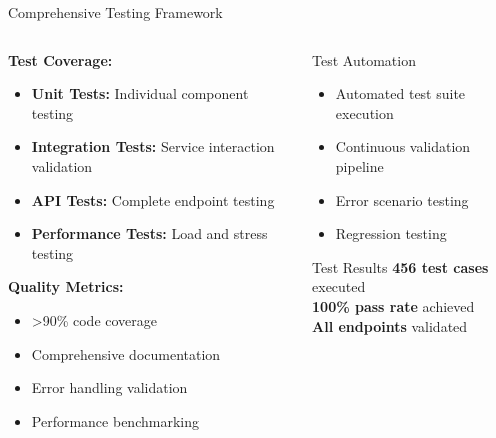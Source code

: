 \documentclass[aspectratio=169]{beamer}
\begin{document}
\begin{frame}{Comprehensive Testing Framework}
    \begin{columns}[c]
        \begin{column}{0.5\textwidth}
            \textbf{Test Coverage:}
            \begin{itemize}
                \item \textbf{Unit Tests:} Individual component testing
                \item \textbf{Integration Tests:} Service interaction validation
                \item \textbf{API Tests:} Complete endpoint testing
                \item \textbf{Performance Tests:} Load and stress testing
            \end{itemize}
            
            \vspace{0.3cm}
            
            \textbf{Quality Metrics:}
            \begin{itemize}
                \item >90\% code coverage
                \item Comprehensive documentation
                \item Error handling validation
                \item Performance benchmarking
            \end{itemize}
        \end{column}
        \begin{column}{0.5\textwidth}
            \begin{block}{Test Automation}
                \begin{itemize}
                    \item Automated test suite execution
                    \item Continuous validation pipeline
                    \item Error scenario testing
                    \item Regression testing
                \end{itemize}
            \end{block}
            
            \begin{alertblock}{Test Results}
                \textbf{456 test cases} executed\\
                \textbf{100\% pass rate} achieved\\
                \textbf{All endpoints} validated
            \end{alertblock}
        \end{column}
    \end{columns}
\end{frame}
\end{document}
